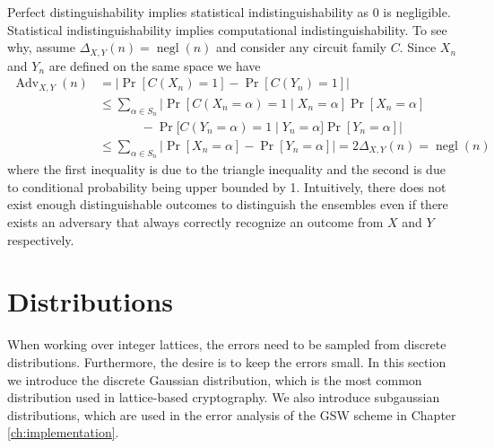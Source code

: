 Perfect distinguishability implies statistical indistinguishability as 0 is negligible. Statistical indistinguishability implies computational indistinguishability. To see why, assume $\Delta_{X,Y}(n) = \operatorname{negl}(n)$ and consider any circuit family $C$. Since $X_n$ and $Y_n$ are defined on the same space we have
\begin{equation*}
\begin{aligned}
    \operatorname{Adv}_{X,Y}(n) &= |\operatorname{Pr}[C(X_n) = 1] - \operatorname{Pr}[C(Y_n) = 1]|\\
        &\leq \sum_{\alpha \in S_n} | \operatorname{Pr}[C(X_n = \alpha) = 1 \; | \; X_n = \alpha]\operatorname{Pr}[X_n = \alpha] \\
        &\phantom{=} \qquad - \operatorname{Pr}[C(Y_n = \alpha) = 1 \; | \; Y_n = \alpha]\operatorname{Pr}[Y_n = \alpha] | \\
        &\leq \sum_{\alpha \in S_n} | \operatorname{Pr}[X_n = \alpha] - \operatorname{Pr}[Y_n = \alpha]| = 2\Delta_{X,Y}(n) = \operatorname{negl}(n)
\end{aligned}
\end{equation*}
where the first inequality is due to the triangle inequality and the second is due to conditional probability being upper bounded by 1. Intuitively, there does not exist enough distinguishable outcomes to distinguish the ensembles even if there exists an adversary that always correctly recognize an outcome from $X$ and $Y$ respectively.

\section{Distributions}
When working over integer lattices, the errors need to be sampled from discrete distributions. Furthermore, the desire is to keep the errors small. In this section we introduce the discrete Gaussian distribution, which is the most common distribution used in lattice-based cryptography. We also introduce subgaussian distributions, which are used in the error analysis of the GSW scheme in Chapter \ref{ch:implementation}.



